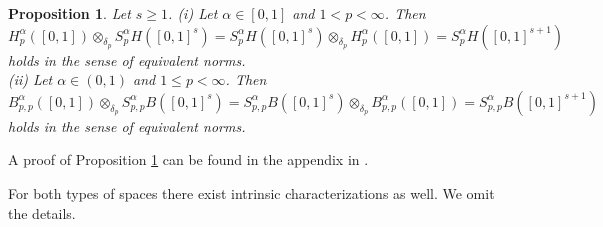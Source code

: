 \documentclass[12pt]{article}
\newtheorem{proposition}{Proposition}
\newtheorem{remark}{Remark}
\newcommand{\NN}{\mathbb{N}}
\newcommand{\RR}{\mathbb{R}}
\newcommand{\re}{\mathbb{R}}
\newcommand{\N}{\mathbb{N}}
\newcommand{\beqq}{\begin{eqnarray*}}
\newcommand{\eeqq}{\end{eqnarray*}}
\newcommand{\mig}[1]{\textcolor{blue}{#1}}
\begin{document}
\begin{proposition}\label{tensor4} 
Let $s\ge 1$. 
{\rm (i)} Let   $\alpha \in [0,1]$ and $1 < p<\infty$.
Then
 \begin{equation}\label{eq-5b}
H^\alpha_p([0,1]) \otimes_{\delta_p} S^\alpha_pH([0,1]^s) = S^\alpha_pH([0,1]^s) \otimes_{\delta_p} H^\alpha_p([0,1])=  S^\alpha_pH([0,1]^{s+1})
 \end{equation}
 holds in the sense of equivalent norms.
 \\
{\rm (ii)} Let   $\alpha \in (0,1)$ and $1 \le  p<\infty$.
Then
 \begin{equation}\label{eq-5c}
B^\alpha_{p,p}([0,1]) \otimes_{\delta_p} S^\alpha_{p,p} B([0,1]^s) = S^\alpha_{p,p}B([0,1]^s) \otimes_{\delta_p} B^\alpha_{p,p}([0,1])=  S^\alpha_{p,p}B([0,1]^{s+1})
 \end{equation}
 holds in the sense of equivalent norms.
\end{proposition}


A proof of Proposition \ref{tensor4} can be found in the appendix in \cite{SU2}.

For both types of spaces there exist intrinsic characterizations as well. We omit the details.

\end{document}
